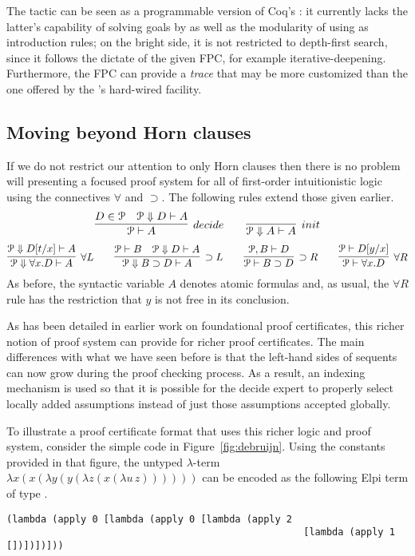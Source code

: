 The  tactic can be seen as a programmable version of
Coq's : it currently lacks the latter's capability of
solving goals by  as well as the modularity of using
 as introduction rules; on the bright side, it is not
restricted to depth-first search, since it follows the dictate of the
given FPC, for example iterative-deepening. Furthermore, the FPC can
provide a \emph{trace} that may be more customized than the one
offered by the 's hard-wired  facility.

\subsection{Moving beyond Horn clauses}
\label{ssec:beyond}

If we do not restrict our attention to only Horn clauses then there is
no problem will presenting a focused proof system for all of
first-order intuitionistic logic using the connectives $\forall$ and
$\supset$.  The following rules extend those given earlier.
\[
  \infer[decide]{\Pscr\vdash A}{D \in \Pscr\quad \Pscr\Downarrow D\vdash A}
  \qquad
  \infer[init]{\Pscr\Downarrow A\vdash A}{}
\]
\[
  \infer[\forall L]{\Pscr\Downarrow\forall x. D\vdash A}
        {\Pscr\Downarrow D[t/x]\vdash A}
  \qquad
  \infer[\supset L]{\Pscr\Downarrow B\supset D\vdash A}
        {\Pscr\vdash B\quad \Pscr\Downarrow D\vdash A}
  \qquad
  \infer[\supset R]{\Pscr\vdash B\supset D}{\Pscr, B\vdash D}
  \qquad
  \infer[\forall R]{\Pscr\vdash \forall x.D}{\Pscr\vdash D[y/x]}
\]
As before, the syntactic variable $A$ denotes atomic formulas and, as
usual, the $\forall R$ rule has the restriction that $y$ is not free in
its conclusion.

As has been detailed in earlier work on foundational proof
certificates, this richer notion of proof system can provide for
richer proof certificates.  The main differences with what we have
seen before is that the left-hand sides of sequents can now grow
during the proof checking process.  As a result, an indexing mechanism
is used so that it is possible for the decide expert to properly
select locally added assumptions instead of just those assumptions
accepted globally.

\newpage

To illustrate a proof certificate format that uses this richer logic
and proof system, consider the simple \lP code in
Figure~\ref{fig:debruijn}.  Using the constants provided in that
figure, the untyped $\lambda$-term
$\lambda x (x (\lambda y (y (\lambda z (x (\lambda u\,z))))))$ can be
encoded as the following Elpi term of type .
%
\begin{lstlisting}[basicstyle=\ttfamily,language=lprolog]
(lambda (apply 0 [lambda (apply 0 [lambda (apply 2 
                                                    [lambda (apply 1 [])])])]))
\end{lstlisting}




